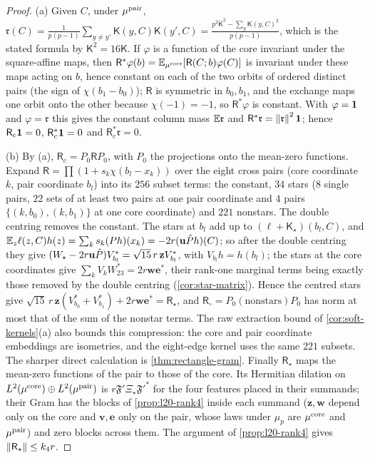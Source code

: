 \begin{proof}
(a) Given $C$, under $\mu^{\rm pair}$, $\mathfrak r(C)=\frac1{p(p-1)}\sum_{y\ne y'}
\mathsf K(y,C)\mathsf K(y',C)=\frac{p^2\bar{\mathsf K}^2-\sum_y\mathsf K(y,C)^2}{p(p-1)}$,
which is the stated formula by $\mathsf K^2=16\mathsf K$. If $\varphi$ is a
function of the core invariant under the square-affine maps, then
$\mathsf R^*\varphi(b)=\mathbb E_{\mu^{\rm core}}[\mathsf R(C;b)\varphi(C)]$ is invariant
under these maps acting on $b$, hence constant on each of the two orbits of
ordered distinct pairs (the sign of $\chi(b_1-b_0)$); $\mathsf R$ is symmetric
in $b_0,b_1$, and the exchange maps one orbit onto the other because
$\chi(-1)=-1$, so $\mathsf R^*\varphi$ is constant. With $\varphi=\mathbf 1$ and
$\varphi=\mathfrak r$ this gives the constant column mass $\mathbb E\mathfrak r$ and
$\mathsf R^*\mathfrak r=\left\|\mathfrak r\right\|^2\mathbf 1$; hence $\mathsf R_c\mathbf 1=0$,
$\mathsf R_c^*\mathbf 1=0$ and $\mathsf R_c^*\mathfrak r=0$.

(b) By (a), $\mathsf R_c=P_0\mathsf RP_0$, with $P_0$ the projections onto the
mean-zero functions. Expand
$\mathsf R=\prod(1+s_k\chi(b_l-x_k))$ over the eight cross pairs (core
coordinate $k$, pair coordinate $b_l$) into its $256$ subset terms: the
constant, $34$ stars ($8$ single pairs, $22$ sets of at least two pairs at one
pair coordinate and $4$ pairs $\{(k,b_0),(k,b_1)\}$ at one core coordinate)
and $221$ nonstars. The double centring removes the constant. The stars at
$b_l$ add up to $(\ell+\mathsf K_\star)(b_l,C)$, and
$\mathbb E_z\ell(z,C)h(z)=\sum_ks_k(Ph)(x_k)=-2r(\mathbf u\hat P h)(C)$; so after the
double centring they give $(W_\star-2r\mathbf u\hat P)V^*_{b_l}=\sqrt{15}\,r\,\mathbf zV^*_{b_l}$,
with $V_{b_l}h=h(b_l)$; the stars at the core coordinates give
$\sum_kV_kW_{23}^*=2r\mathbf w\mathbf e^*$, their rank-one marginal terms being
exactly those removed by the double centring (\cref{cor:star-matrix}).
Hence the centred stars give
$\sqrt{15}\,r\,\mathbf z(V^*_{b_0}+V^*_{b_1})+2r\mathbf w\mathbf e^*=\mathsf R_\star$,
and $\mathsf R_\circ=P_0(\text{nonstars})P_0$ has norm at most that of the sum
of the nonstar terms. The raw extraction bound of \cref{cor:soft-kernels}(a)
also bounds this compression: the core and pair coordinate embeddings
are isometries, and the eight-edge kernel uses the same $221$ subsets.
The sharper direct calculation is \cref{thm:rectangle-gram}.
Finally $\mathsf R_\star$ maps the mean-zero functions of the pair to those of
the core. Its Hermitian dilation on $L^2(\mu^{\rm core})\oplus L^2(\mu^{\rm pair})$ is
$r\mathfrak F'\Xi_\star\mathfrak F'^*$ for the four features placed in their
summands; their Gram has the blocks of \cref{prop:l20-rank4} inside each summand
($\mathbf z,\mathbf w$ depend only on the core and $\mathbf v,\mathbf e$ only on
the pair, whose laws under $\mu_p$ are $\mu^{\rm core}$ and $\mu^{\rm pair}$) and
zero blocks across them. The argument of \cref{prop:l20-rank4} gives
$\left\|\mathsf R_\star\right\|\le k_4r$.


\end{proof}
